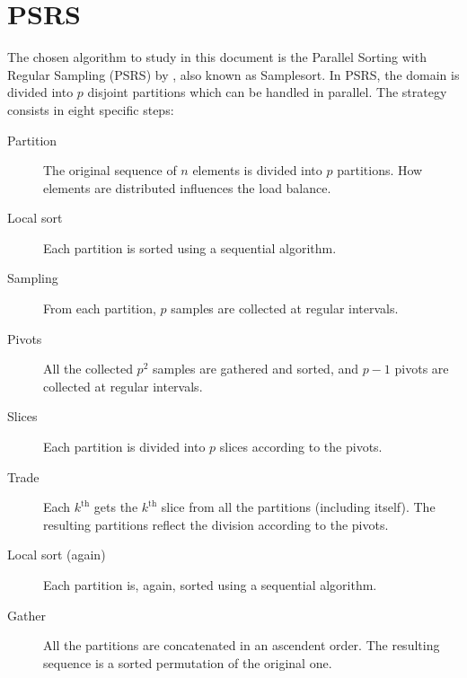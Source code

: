 \documentclass[abstract=on,9pt,twocolumn]{scrartcl}
\begin{document}
\section{PSRS}
\label{sec:algorithm}
The chosen algorithm to study in this document is the Parallel Sorting with Regular Sampling (PSRS) by \cite{Li1993}, also known as Samplesort. In PSRS, the domain is divided into $p$ disjoint partitions which can be handled in parallel. The strategy consists in eight specific steps:
\begin{description}
	\item[Partition]{The original sequence of $n$ elements is divided into $p$ partitions. How elements are distributed influences the load balance.}
	\item[Local sort]{Each partition is sorted using a sequential algorithm.}
	\item[Sampling]{From each partition, $p$ samples are collected at regular intervals.}
	\item[Pivots]{All the collected $p^{2}$ samples are gathered and sorted, and $p-1$ pivots are collected at regular intervals.}
	\item[Slices]{Each partition is divided into $p$ slices according to the pivots.}
	\item[Trade]{Each $k^{\mathrm{th}}$ gets the $k^{\mathrm{th}}$ slice from all the partitions (including itself). The resulting partitions reflect the division according to the pivots.}
	\item[Local sort (again)]{Each partition is, again, sorted using a sequential algorithm.}
	\item[Gather]{All the partitions are concatenated in an ascendent order. The resulting sequence is a sorted permutation of the original one.}
\end{description}
\end{document}

